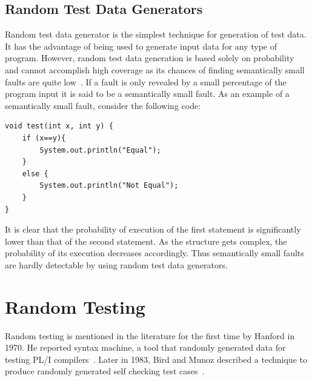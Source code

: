 

\subsection{Random Test Data Generators}
\label{sec:randomgenerator_2}
Random test data generator is the simplest technique for generation of test data. It has the advantage of being used to generate input data for any type of program. However, random test data generation is based solely on probability and cannot accomplish high coverage as its chances of finding semantically small faults are quite low~\cite{godefroid2005dart}. If a fault is only revealed by a small percentage of the program input it is said to be a semantically small fault. As an example of a semantically small fault, consider the following code:

\begin{lstlisting}
void test(int x, int y) {
    if (x==y){
        System.out.println("Equal");
    }
    else {
        System.out.println("Not Equal");
    }
}
\end{lstlisting}

It is clear that the probability of execution of the first statement is significantly lower than that of the second statement. As the structure gets complex, the probability of its execution decreases accordingly. Thus semantically small faults are hardly detectable by using random test data generators. 



\section{Random Testing}
Random testing is mentioned in the literature for the first time by Hanford in 1970. He reported syntax machine, a tool that randomly generated data for testing PL/I compilers~\cite{hanford1970automatic}. Later in 1983, Bird and Munoz described a technique to produce randomly generated self checking test cases~\cite{bird1983automatic}. 


